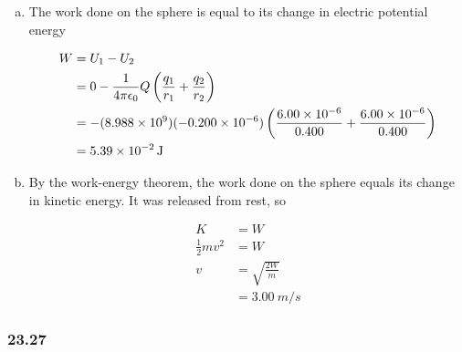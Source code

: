 \documentclass{article}
\begin{document}
\begin{enumerate}[a)]
  \item The work done on the sphere is equal to its change in electric potential energy

        \begin{align*}
          W & = U_1 - U_2                                                                                                   \\
            & = 0 - \frac{1}{4 \pi \epsilon_0} Q \left( \frac{q_1}{r_1} + \frac{q_2}{r_2} \right)                                                  \\
            & = -(\num{8.988e9}) (\num{-0.200e-6}) \left( \frac{\num{6.00e-6}}{0.400} + \frac{\num{6.00e-6}}{0.400} \right) \\
            & = \qty{5.39e-2}{J}
        \end{align*}

  \item By the work-energy theorem, the work done on the sphere equals its change in kinetic energy. It was released from rest, so

        \begin{align*}
          K                 & = W                    \\
          \frac{1}{2} m v^2 & = W                    \\
          v                 & = \sqrt{\frac{2 W}{m}} \\
                            & = \qty{3.00}{m/s}
        \end{align*}
\end{enumerate}

\subsubsection{23.27}
\end{document}
